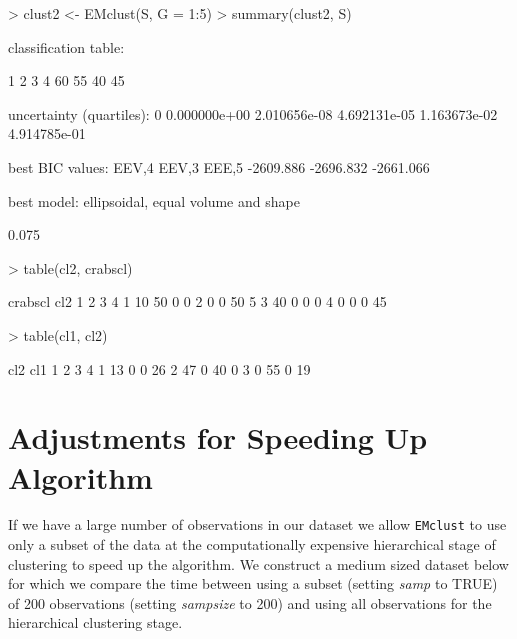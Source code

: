 \documentclass[,12pt]{article}
\newcommand{\Rfunction}[1]{{\texttt{#1}}}
\newcommand{\Rfunarg}[1]{{\textit{#1}}}
\begin{document}
\begin{Schunk}
\begin{Sinput}
> clust2 <- EMclust(S, G = 1:5)
> summary(clust2, S)
\end{Sinput}
\begin{Soutput}

classification table:

 1  2  3  4 
60 55 40 45 

uncertainty (quartiles):
          0%
0.000000e+00 2.010656e-08 4.692131e-05 1.163673e-02 4.914785e-01 

best BIC values:
    EEV,4     EEV,3     EEE,5 
-2609.886 -2696.832 -2661.066 

best model: ellipsoidal, equal volume and shape 


\end{Soutput}
\begin{Soutput}
[1] 0.075

\end{Soutput}
\begin{Sinput}
> table(cl2, crabscl)
\end{Sinput}
\begin{Soutput}
   crabscl
cl2  1  2  3  4
  1 10 50  0  0
  2  0  0 50  5
  3 40  0  0  0
  4  0  0  0 45

\end{Soutput}
\begin{Sinput}
> table(cl1, cl2)
\end{Sinput}
\begin{Soutput}
   cl2
cl1  1  2  3  4
  1 13  0  0 26
  2 47  0 40  0
  3  0 55  0 19

\end{Soutput}
\end{Schunk}
\section{Adjustments for Speeding Up Algorithm}
If we have a large number of observations in our dataset we allow \Rfunction{EMclust} to use only a subset of the data at the computationally expensive hierarchical stage of clustering to speed up the algorithm. We construct a medium sized dataset below for which we compare the time between using a subset (setting \Rfunarg{samp} to TRUE) of 200 observations (setting \Rfunarg{sampsize} to 200) and using all observations for the hierarchical clustering stage.
\end{document}
